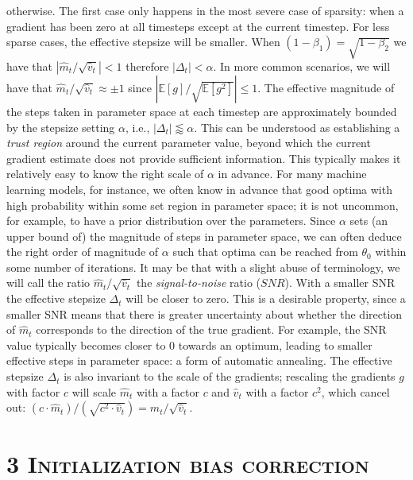 \documentclass[11pt]{article}
\begin{document}
\noindent
otherwise. The first case only happens in the most severe case of
sparsity: when a gradient has been zero at all timesteps except at
the current timestep. For less sparse cases, the effective stepsize
will be smaller. When
$(1 - \beta_1) = \sqrt{1 - \beta_2}$ we have that
$|\widehat{m}_t / \sqrt{\widehat{v}_t}| < 1$ therefore
$|\Delta_t| < \alpha$. In more common scenarios, we will have that
$\widehat{m}_t / \sqrt{\widehat{v}_t} \approx \pm 1$ since
$|\mathbb{E}[g] / \sqrt{\mathbb{E}[g^2]}| \leq 1$. The effective
magnitude of the steps taken in parameter space at each timestep
are approximately bounded by the stepsize setting $\alpha$, i.e.,
$|\Delta_t| \lessapprox \alpha$. This can be understood as
establishing a \emph{trust region} around the current parameter
value, beyond which the current gradient estimate does not provide
sufficient information. This typically makes it relatively easy to
know the right scale of $\alpha$ in advance. For many machine
learning models, for instance, we often know in advance that good
optima with high probability within some set region in parameter
space; it is not uncommon, for example, to have a prior
distribution over the parameters. Since $\alpha$ sets (an upper
bound of) the magnitude of steps in parameter space, we can often
deduce the right order of magnitude of $\alpha$ such that optima
can be reached from $\theta_0$ within some number of iterations.
It may be that with a slight abuse of terminology, we will call
the ratio $\widehat{m}_t / \sqrt{\widehat{v}_t}$ the
\emph{signal-to-noise} ratio ($SNR$). With a smaller SNR the
effective stepsize $\Delta_t$ will be closer to zero. This is a
desirable property, since a smaller SNR means that there is
greater uncertainty about whether the direction of
$\widehat{m}_t$ corresponds to the direction of the true gradient.
For example, the SNR value typically becomes closer to 0 towards
an optimum, leading to smaller effective steps in parameter space:
a form of automatic annealing. The effective stepsize $\Delta_t$
is also invariant to the scale of the gradients; rescaling the
gradients $g$ with factor $c$ will scale $\widehat{m}_t$ with a
factor $c$ and $\widehat{v}_t$ with a factor $c^2$, which cancel
out:
$(c \cdot \widehat{m}_t) / (\sqrt{c^2 \cdot \widehat{v}_t}) =
 \widehat{m}_t / \sqrt{\widehat{v}_t}$.

\vspace{1em}

\section*{3 \textsc{Initialization bias correction}}
\end{document}
